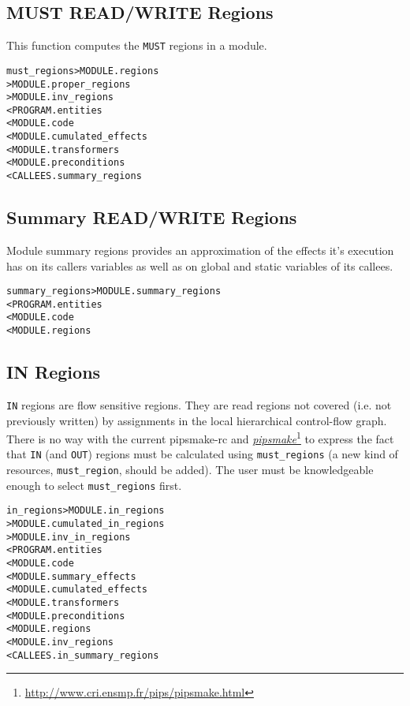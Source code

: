 \documentclass[a4paper]{report}
\newenvironment{PipsMake}{\begin{alltt}}{\end{alltt}}
\newcommand{\LINK}[2]{\href{#2}{#1}\footnote{\url{#2}}\xspace}
\newcommand{\PIPSMAKE}{\LINK{\emph{pipsmake}}{http://www.cri.ensmp.fr/pips/pipsmake.html}\xspace}
\begin{document}
\subsection{MUST READ/WRITE Regions}
\label{subsubsection-must-regions}

This function computes the \verb|MUST| regions in a module.
\begin{PipsMake}
must_regions                    > MODULE.regions
                                > MODULE.proper_regions
                                > MODULE.inv_regions
        < PROGRAM.entities
        < MODULE.code
        < MODULE.cumulated_effects
        < MODULE.transformers
        < MODULE.preconditions     
        < CALLEES.summary_regions
\end{PipsMake}

\subsection{Summary READ/WRITE Regions}
\label{subsubsection-summary-regions}

Module summary regions provides an approximation of the effects it's
execution has on its callers variables as well as on global and
static variables of its callees.

\begin{PipsMake}
summary_regions                 > MODULE.summary_regions
        < PROGRAM.entities
        < MODULE.code
        < MODULE.regions  
\end{PipsMake}

\subsection{IN Regions}
\label{subsubsection-in-regions}

\verb+IN+ regions are flow sensitive regions. They are read regions not
covered (i.e. not previously written) by assignments in the local
hierarchical control-flow graph. There is no way with the current
pipsmake-rc and \PIPSMAKE{} to express the fact that \verb+IN+ (and \verb+OUT+)
regions must be calculated using \verb+must_regions+ (a new kind of
resources, \verb+must_region+, should be added). The user must be
knowledgeable enough to select \verb+must_regions+ first.

\begin{PipsMake}
in_regions                      > MODULE.in_regions
                                > MODULE.cumulated_in_regions
                                > MODULE.inv_in_regions
        < PROGRAM.entities
        < MODULE.code 
        < MODULE.summary_effects
        < MODULE.cumulated_effects
        < MODULE.transformers
        < MODULE.preconditions
        < MODULE.regions
        < MODULE.inv_regions
        < CALLEES.in_summary_regions
\end{PipsMake}
\end{document}
